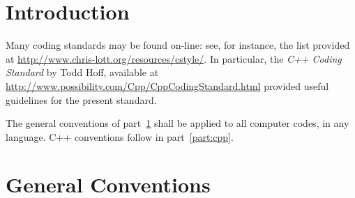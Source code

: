 %
%


\newcommand{\cscode}[1]{\texttt{#1}}
\newcommand{\csrule}[1]{\textsc{#1}}
\newcommand{\cscomment}[1]{\newline #1}
\newcommand{\cscommentf}[1]{#1}
\newcommand{\csjustification}[1]{\newline {\it Justification} --- #1}
\newcommand{\csnjustification}[1]{{\it Justification} --- #1}
\newcommand{\csjustificationf}[1]{#1}

\newenvironment{cenumerate}
{
  \begin{enumerate}\setcounter{enumi}{\value{points}}%
  }
  {
    \setcounter{points}{\value{enumi}}\end{enumerate}
}



\section*{Introduction}
\label{part:introduction}

Many coding standards may be found on-line: see, for instance, the list
provided at \url{http://www.chris-lott.org/resources/cstyle/}. In particular,
the \textit{C++ Coding Standard} by Todd Hoff, available at
\url{http://www.possibility.com/Cpp/CppCodingStandard.html} provided useful
guidelines for the present standard.

The general conventions of part~\ref{part:general} shall be applied to all
computer codes, in any language. C++ conventions follow in
part~\ref{part:cpp}.




\section{General Conventions}
\label{part:general}

